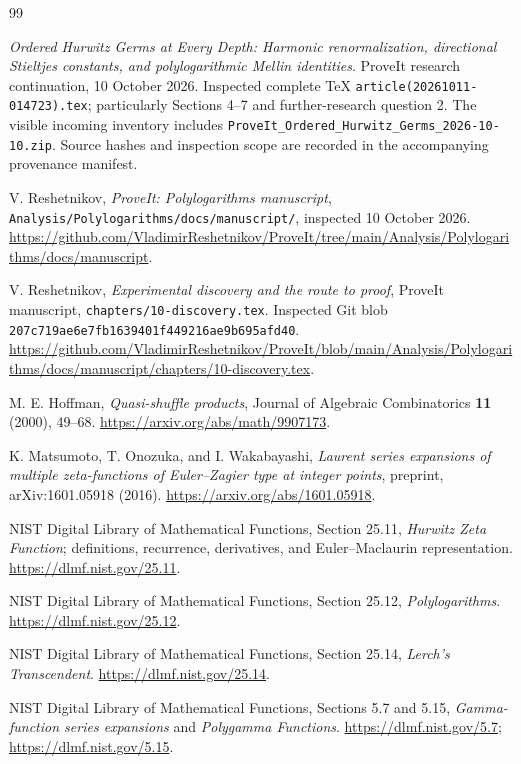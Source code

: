 \documentclass[11pt]{article}
\numberwithin{equation}{section}
\theoremstyle{definition}
\begin{document}
\clearpage
\begin{thebibliography}{99}\raggedright
{}
\emph{Ordered Hurwitz Germs at Every Depth: Harmonic renormalization,
directional Stieltjes constants, and polylogarithmic Mellin identities}.
ProveIt research continuation, 10 October 2026. Inspected complete TeX
\texttt{article(20261011-014723).tex}; particularly Sections 4--7 and
further-research question 2. The visible incoming inventory includes
\texttt{ProveIt\_Ordered\_Hurwitz\_Germs\_2026-10-10.zip}. Source hashes
and inspection scope are recorded in the accompanying provenance manifest.

V. Reshetnikov, \emph{ProveIt: Polylogarithms manuscript},
\nolinkurl{Analysis/Polylogarithms/docs/manuscript/}, inspected 10 October 2026.
\url{https://github.com/VladimirReshetnikov/ProveIt/tree/main/Analysis/Polylogarithms/docs/manuscript}.

V. Reshetnikov, \emph{Experimental discovery and the route to proof},
ProveIt manuscript, \texttt{chapters/10-discovery.tex}. Inspected Git blob
\texttt{207c719ae6e7fb1639401f449216ae9b695afd40}.
\url{https://github.com/VladimirReshetnikov/ProveIt/blob/main/Analysis/Polylogarithms/docs/manuscript/chapters/10-discovery.tex}.

M. E. Hoffman, \emph{Quasi-shuffle products}, Journal of Algebraic
Combinatorics \textbf{11} (2000), 49--68.
\url{https://arxiv.org/abs/math/9907173}.

K. Matsumoto, T. Onozuka, and I. Wakabayashi,
\emph{Laurent series expansions of multiple zeta-functions of Euler--Zagier
type at integer points}, preprint, arXiv:1601.05918 (2016).
\url{https://arxiv.org/abs/1601.05918}.

NIST Digital Library of Mathematical Functions, Section 25.11,
\emph{Hurwitz Zeta Function}; definitions, recurrence, derivatives,
and Euler--Maclaurin representation.
\url{https://dlmf.nist.gov/25.11}.

NIST Digital Library of Mathematical Functions, Section 25.12,
\emph{Polylogarithms}.
\url{https://dlmf.nist.gov/25.12}.

NIST Digital Library of Mathematical Functions, Section 25.14,
\emph{Lerch's Transcendent}.
\url{https://dlmf.nist.gov/25.14}.

NIST Digital Library of Mathematical Functions, Sections 5.7 and 5.15,
\emph{Gamma-function series expansions} and \emph{Polygamma Functions}.
\url{https://dlmf.nist.gov/5.7}; \url{https://dlmf.nist.gov/5.15}.
\end{thebibliography}
\end{document}
